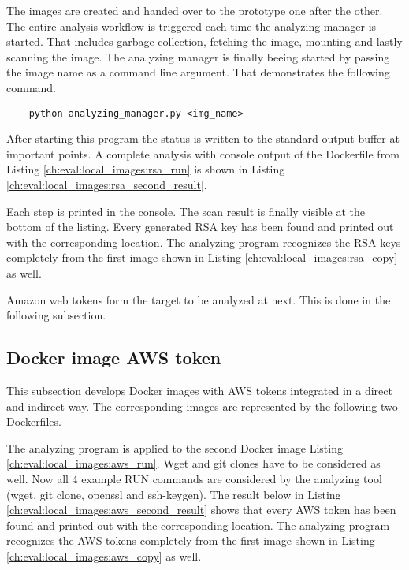 The images are created and handed over to the prototype one after the other.
The entire analysis workflow is triggered each time the analyzing manager is started. 
That includes garbage collection, fetching the image, mounting and lastly scanning the image.
The analyzing manager is finally beeing started by passing the image name as a command line argument. 
That demonstrates the following command.
\begin{lstlisting}
	python analyzing_manager.py <img_name>
\end{lstlisting}
After starting this program the status is written to the standard output buffer at important points.
A complete analysis with console output of the Dockerfile from Listing \ref{ch:eval:local_images:rsa_run} is shown in Listing \ref{ch:eval:local_images:rsa_second_result}.

Each step is printed in the console. The scan result is finally visible at the bottom of the listing. 
Every generated RSA key has been found and printed out with the corresponding location.
The analyzing program recognizes the RSA keys completely from the first image shown in Listing \ref{ch:eval:local_images:rsa_copy} as well. 

Amazon web tokens form the target to be analyzed at next. This is done in the following subsection. 

\subsection{Docker image AWS token}
\label{ch:eval:local_images:aws}
This subsection develops Docker images with AWS tokens integrated in a direct and indirect way. 
The corresponding images are represented by the following two Dockerfiles.


The analyzing program is applied to the second Docker image Listing \ref{ch:eval:local_images:aws_run}. 
Wget and git clones have to be considered as well. 
Now all 4 example RUN commands are considered by the analyzing tool (wget, git clone, openssl and ssh-keygen). 
The result below in Listing \ref{ch:eval:local_images:aws_second_result} shows that every AWS token has been found and printed out with the corresponding location.
The analyzing program recognizes the AWS tokens completely from the first image shown in Listing \ref{ch:eval:local_images:aws_copy} as well.



